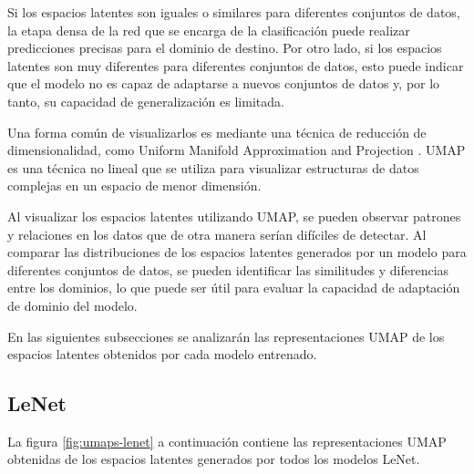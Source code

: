 Si los espacios latentes son iguales o similares para diferentes conjuntos de datos, la etapa densa de la red que se
encarga de la clasificación puede realizar predicciones precisas para el dominio de destino. Por otro lado, si los
espacios latentes son muy diferentes para diferentes conjuntos de datos, esto puede indicar que el modelo no es capaz
de adaptarse a nuevos conjuntos de datos y, por lo tanto, su capacidad de generalización es limitada.

Una forma común de visualizarlos es mediante una técnica de reducción de dimensionalidad, como Uniform Manifold
Approximation and Projection \parencite{mcinnes2018umap}. UMAP es una técnica no lineal que se utiliza para visualizar estructuras de datos complejas en
un espacio de menor dimensión.

Al visualizar los espacios latentes utilizando UMAP, se pueden observar patrones y relaciones en los datos que de otra
manera serían difíciles de detectar. Al comparar las distribuciones de los espacios latentes generados por un modelo
para diferentes conjuntos de datos, se pueden identificar las similitudes y diferencias entre los dominios, lo que
puede ser útil para evaluar la capacidad de adaptación de dominio del modelo.

En las siguientes subsecciones se analizarán las representaciones UMAP de los espacios latentes obtenidos por cada
modelo entrenado.

\subsection{LeNet}

La figura \ref{fig:umaps-lenet} a continuación contiene las representaciones UMAP obtenidas de los espacios latentes
generados por todos los modelos LeNet.

